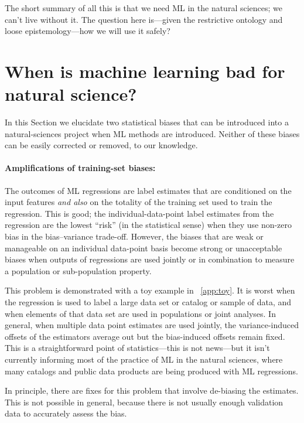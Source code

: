 \documentclass[10pt]{article}
\newcommand{\sectionname}{Section}
\begin{document}
The short summary of all this is that we need ML in the natural sciences; we can't live without it.
The question here is---given the restrictive ontology and loose epistemology---how we will use it safely?

\section{When is machine learning bad for natural science?}\label{sec:bad}
In this \sectionname{} we elucidate two statistical biases that can be introduced into a natural-sciences project when ML methods are introduced.
Neither of these biases can be easily corrected or removed, to our knowledge.

\paragraph{Amplifications of training-set biases:}
The outcomes of ML regressions are label estimates that are conditioned on the input features \emph{and also} on the totality of the training set used to train the regression.
This is good; the individual-data-point label estimates from the regression are the lowest ``risk'' (in the statistical sense) when they use non-zero bias in the bias--variance trade-off.
However, the biases that are weak or manageable on an individual data-point basis become strong or unacceptable biases when outputs of regressions are used jointly or in combination to measure a population or sub-population property.

This problem is demonstrated with a toy example in \appendixname~\ref{app:toy}.
It is worst when the regression is used to label a large data set or catalog or sample of data,
and when elements of that data set are used in populations or joint analyses.
In general, when multiple data point estimates are used jointly, the variance-induced offsets of the estimators average out but the bias-induced offsets remain fixed.
This is a straightforward point of statistics---this is not news---but it isn't currently informing most of the practice of ML in the natural sciences, where many catalogs and public data products are being produced with ML regressions.

In principle, there are fixes for this problem that involve de-biasing the estimates.
This is not possible in general, because there is not usually enough validation data to accurately assess the bias.
\end{document}
